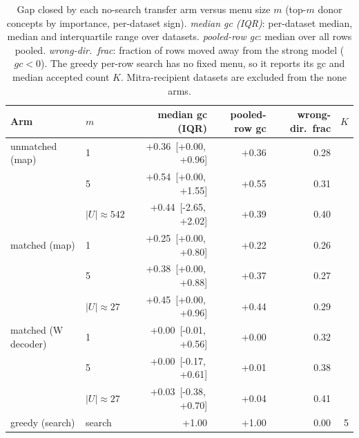 \begin{table}[t]
\centering
\small
\setlength{\tabcolsep}{5pt}
\begin{tabular}{l l r r r r}
\toprule
Arm & $m$ & median gc (IQR) & pooled-row gc & wrong-dir.\ frac & $K$ \\
\midrule
unmatched (map) & 1 & +0.36\ [+0.00,\,+0.96] & +0.36 & 0.28 & \\
 & 5 & +0.54\ [+0.00,\,+1.55] & +0.55 & 0.31 & \\
 & $|U|{\approx}542$ & +0.44\ [-2.65,\,+2.02] & +0.39 & 0.40 & \\
\addlinespace[2pt]
matched (map) & 1 & +0.25\ [+0.00,\,+0.80] & +0.22 & 0.26 & \\
 & 5 & +0.38\ [+0.00,\,+0.88] & +0.37 & 0.27 & \\
 & $|U|{\approx}27$ & +0.45\ [+0.00,\,+0.96] & +0.44 & 0.29 & \\
\addlinespace[2pt]
matched (W decoder) & 1 & +0.00\ [-0.01,\,+0.56] & +0.00 & 0.32 & \\
 & 5 & +0.00\ [-0.17,\,+0.61] & +0.01 & 0.38 & \\
 & $|U|{\approx}27$ & +0.03\ [-0.38,\,+0.70] & +0.04 & 0.41 & \\
\midrule
greedy (search) & search & +1.00 & +1.00 & 0.00 & 5 \\
\bottomrule
\end{tabular}
\caption{%
  Gap closed by each no-search transfer arm versus menu size $m$ (top-$m$   donor concepts by importance, per-dataset sign). \emph{median gc (IQR)}:   per-dataset median, median and interquartile range over datasets.   \emph{pooled-row gc}: median over all rows pooled. \emph{wrong-dir.\ frac}:   fraction of rows moved away from the strong model ($gc<0$). The greedy   per-row search has no fixed menu, so it reports its gc and median accepted   count $K$. Mitra-recipient datasets are excluded from the none arms.
}
\label{tab:transfer_gc}
\end{table}